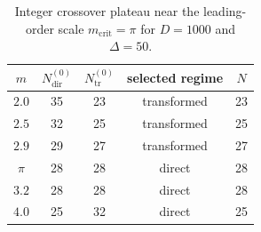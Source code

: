 \begin{table}[t]
\centering
\small
\begin{tabular}{c c c c c}
\hline
$m$ & $N_{\mathrm{dir}}^{(0)}$ & $N_{\mathrm{tr}}^{(0)}$ & selected regime & $N$ \\
\hline
$2.0$ & 35 & 23 & transformed & 23 \\
$2.5$ & 32 & 25 & transformed & 25 \\
$2.9$ & 29 & 27 & transformed & 27 \\
$\pi$ & 28 & 28 & direct & 28 \\
$3.2$ & 28 & 28 & direct & 28 \\
$4.0$ & 25 & 32 & direct & 25 \\
\hline
\end{tabular}
\caption{Integer crossover plateau near the leading-order scale $m_{\mathrm{crit}}=\pi$ for $D=1000$ and $\Delta=50$.}
\label{tab:crossover-plateau}
\end{table}
